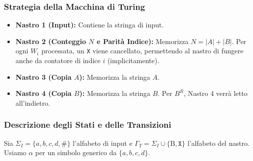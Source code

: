 \documentclass[a4paper]{article}
\newcommand{\B}{\text{B}} %
\begin{document}
\subsubsection{Strategia della Macchina di Turing}
\begin{itemize}
    \item \textbf{Nastro 1 (Input):} Contiene la stringa di input.
    \item \textbf{Nastro 2 (Conteggio $N$ e Parità Indice):} Memorizza $N = |A| + |B|$. Per ogni $W_i$ processata, un \texttt{X} viene cancellato, permettendo al nastro di fungere anche da contatore di indice $i$ (implicitamente).
    \item \textbf{Nastro 3 (Copia $A$):} Memorizza la stringa $A$.
    \item \textbf{Nastro 4 (Copia $B$):} Memorizza la stringa $B$. Per $B^R$, Nastro 4 verrà letto all'indietro.
\end{itemize}

\subsubsection{Descrizione degli Stati e delle Transizioni}
Sia $\Sigma_I = \{a,b,c,d,\texttt{\#}\}$ l'alfabeto di input e $\Gamma_T = \Sigma_I \cup \{\B, \texttt{X}\}$ l'alfabeto del nastro. Usiamo $\alpha$ per un simbolo generico da $\{a,b,c,d\}$.
\end{document}
